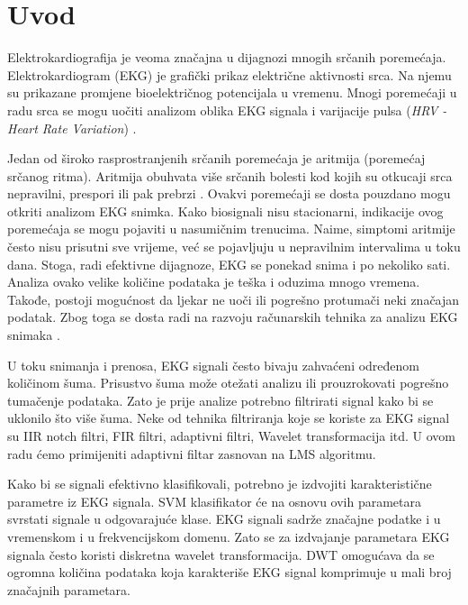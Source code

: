 \documentclass[12pt]{SeminarskiADS}
\begin{document}
\maketitle 


\section{Uvod}
Elektrokardiografija je veoma značajna u dijagnozi mnogih srčanih poremećaja. Elektrokardiogram (EKG) je grafički prikaz električne aktivnosti srca. Na njemu su prikazane promjene bioelektričnog potencijala u vremenu. Mnogi poremećaji u radu srca se mogu uočiti analizom oblika EKG signala i varijacije pulsa (\emph{HRV - Heart Rate Variation}) \cite{gl}. 

Jedan od široko rasprostranjenih srčanih poremećaja je aritmija (poremećaj srčanog ritma). Aritmija obuhvata više srčanih bolesti kod kojih su otkucaji srca nepravilni, prespori ili pak prebrzi \cite{what_is_arr}. Ovakvi poremećaji se dosta pouzdano mogu otkriti analizom EKG snimka. Kako biosignali nisu stacionarni, indikacije ovog poremećaja se mogu pojaviti u nasumičnim trenucima. Naime, simptomi aritmije često nisu prisutni sve vrijeme, već se pojavljuju u nepravilnim intervalima u toku dana. Stoga, radi efektivne dijagnoze, EKG se ponekad snima i po nekoliko sati. Analiza ovako velike količine podataka je teška i oduzima mnogo vremena. Takođe, postoji mogućnost da ljekar ne uoči ili pogrešno protumači neki značajan podatak. Zbog toga se dosta radi na razvoju računarskih tehnika za analizu EKG snimaka \cite{ecg_multiclass_svm}.

U toku snimanja i prenosa, EKG signali često bivaju zahvaćeni određenom količinom šuma. Prisustvo šuma može otežati analizu ili prouzrokovati pogrešno tumačenje podataka. Zato je prije analize potrebno filtrirati signal kako bi se uklonilo što više šuma. Neke od tehnika filtriranja koje se koriste za EKG signal su IIR notch filtri, FIR filtri, adaptivni filtri, Wavelet transformacija itd. \cite{ecg_denoise} U ovom radu ćemo primijeniti adaptivni filtar zasnovan na LMS algoritmu. 

Kako bi se signali efektivno klasifikovali, potrebno je izdvojiti karakteristične parametre iz EKG signala. SVM klasifikator će na osnovu ovih parametara svrstati signale u odgovarajuće klase. EKG signali sadrže značajne podatke i u vremenskom i u frekvencijskom domenu. Zato se za izdvajanje parametara EKG signala često koristi diskretna wavelet transformacija. DWT omogućava da se ogromna količina podataka koja karakteriše EKG signal komprimuje u mali broj značajnih parametara. 
\end{document}

